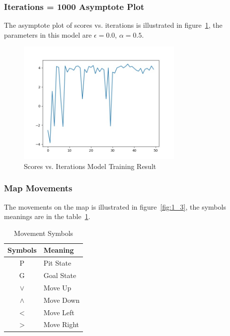 \documentclass[11pt, a4paper]{article}
\begin{document}
\subsubsection{Iterations = 1000 Asymptote Plot}

The asymptote plot of scores vs. iterations is illustrated in figure~\ref{fig:1_2}, the parameters in this model are $\epsilon = 0.0$, $\alpha = 0.5$. 

 \begin{figure}[htbp] 
	\begin{center}
		\includegraphics[width=8cm]{1_1K} 
		\caption{Scores vs. Iterations Model Training Result} 
		\label{fig:1_2}
	\end{center}
\end{figure}

\subsubsection{Map Movements}

The movements on the map is illustrated in figure~\ref{fig:1_3}, the symbols meanings are in the table~\ref{tab:movement}.

\begin{table}[htbp] 
	\begin{center}
		\caption{Movement Symbols}
		\begin{tabular}{c|l} \hline
		 Symbols & Meaning  \\ \hline
		 P     & Pit State \\ \hline
		 G    &  Goal State   \\ \hline
		 $\vee$  & Move Up  \\ \hline
		 $\wedge$  & Move Down \\ \hline
		 $<$  & Move Left  \\ \hline
		 $>$  & Move Right \\ \hline 
 			
		\end{tabular}
		\label{tab:movement}
	\end{center}
\end{table}	
\end{document}
